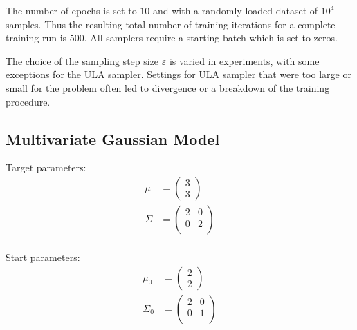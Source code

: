 The number of epochs is set to $10$ and with a randomly loaded dataset of $10^4$ samples.
Thus the resulting total number of training iterations for a complete training run is $500$.
All samplers require a starting batch which is set to zeros.

The choice of the sampling step size $\varepsilon$ is varied in experiments, with some exceptions for the ULA sampler. 
Settings for ULA sampler that were too large or small for the problem often led to divergence or a breakdown of the training procedure.


\subsection{Multivariate Gaussian Model}
Target parameters:
\[
\begin{aligned}
	\mu &= \begin{pmatrix} 3 \\ 3 \end{pmatrix} \\
	\Sigma &= 
	\begin{pmatrix}
		2 & 0 \\
		0 & 2 \\
	\end{pmatrix} \\
\end{aligned}
\]

Start parameters:
\[
\begin{aligned}
	\mu_0 &= \begin{pmatrix} 2 \\ 2 \end{pmatrix} \\
	\Sigma_0 &= 
	\begin{pmatrix}
		2 & 0 \\
		0 & 1 \\
	\end{pmatrix} \\
\end{aligned}
\]


